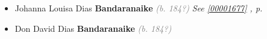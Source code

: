 \documentclass[10pt, openany]{book}
\begin{document}
\begin{itemize}
{\begin{itemize}
{\begin{itemize}
{\begin{itemize}
{\begin{itemize}
{\begin{itemize}
{ }
\end{itemize}}
\end{itemize}
   }
\end{itemize}}
\end{itemize}
   }
\item{Johanna Louisa Dias \textbf{Bandaranaike} \textcolor{gray}{\textit{(b. 184?)}} \textcolor{slteal}{\textit{See  \autoref{00001677} \textit{, p. \pageref{00001677} }}}}
\item{Don David Dias \textbf{Bandaranaike} \textcolor{gray}{\textit{(b. 184?)}}
   }
\end{itemize}}
\end{itemize}
   
\end{document}
